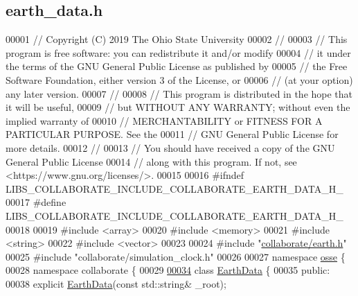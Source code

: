 \hypertarget{earth__data_8h_source}{}\subsection{earth\+\_\+data.\+h}
\label{earth__data_8h_source}

\begin{DoxyCode}
00001 \textcolor{comment}{// Copyright (C) 2019 The Ohio State University}
00002 \textcolor{comment}{//}
00003 \textcolor{comment}{// This program is free software: you can redistribute it and/or modify}
00004 \textcolor{comment}{// it under the terms of the GNU General Public License as published by}
00005 \textcolor{comment}{// the Free Software Foundation, either version 3 of the License, or}
00006 \textcolor{comment}{// (at your option) any later version.}
00007 \textcolor{comment}{//}
00008 \textcolor{comment}{// This program is distributed in the hope that it will be useful,}
00009 \textcolor{comment}{// but WITHOUT ANY WARRANTY; without even the implied warranty of}
00010 \textcolor{comment}{// MERCHANTABILITY or FITNESS FOR A PARTICULAR PURPOSE.  See the}
00011 \textcolor{comment}{// GNU General Public License for more details.}
00012 \textcolor{comment}{//}
00013 \textcolor{comment}{// You should have received a copy of the GNU General Public License}
00014 \textcolor{comment}{// along with this program.  If not, see <https://www.gnu.org/licenses/>.}
00015 
00016 \textcolor{preprocessor}{#ifndef LIBS\_COLLABORATE\_INCLUDE\_COLLABORATE\_EARTH\_DATA\_H\_}
00017 \textcolor{preprocessor}{#define LIBS\_COLLABORATE\_INCLUDE\_COLLABORATE\_EARTH\_DATA\_H\_}
00018 
00019 \textcolor{preprocessor}{#include <array>}
00020 \textcolor{preprocessor}{#include <memory>}
00021 \textcolor{preprocessor}{#include <string>}
00022 \textcolor{preprocessor}{#include <vector>}
00023 
00024 \textcolor{preprocessor}{#include "\hyperlink{earth_8h}{collaborate/earth.h}"}
00025 \textcolor{preprocessor}{#include "collaborate/simulation\_clock.h"}
00026 
00027 \textcolor{keyword}{namespace }\hyperlink{namespaceosse}{osse} \{
00028 \textcolor{keyword}{namespace }collaborate \{
00029 
\hyperlink{classosse_1_1collaborate_1_1_earth_data}{00034} \textcolor{keyword}{class }\hyperlink{classosse_1_1collaborate_1_1_earth_data}{EarthData} \{
00035  \textcolor{keyword}{public}:
00038   \textcolor{keyword}{explicit} \hyperlink{classosse_1_1collaborate_1_1_earth_data_a77ce398a29306b84cdddbd937cb62bbd}{EarthData}(\textcolor{keyword}{const} std::string& \_root);

\end{DoxyCode}
